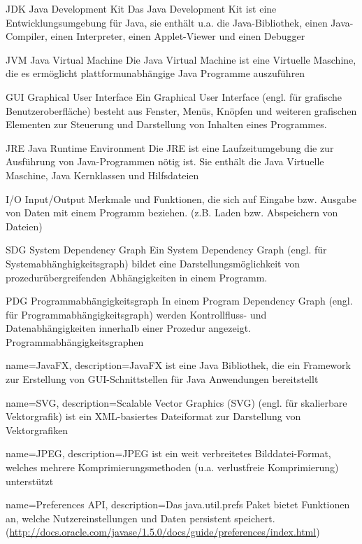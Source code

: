  {JDK}
  {Java Development Kit}
  {Das Java Development Kit ist eine Entwicklungsumgebung für Java, sie enthält u.a. die Java-Bibliothek, einen Java-Compiler, einen Interpreter, einen Applet-Viewer und einen Debugger}

  {JVM}
  {Java Virtual Machine}
  {Die Java Virtual Machine ist eine Virtuelle Maschine, die es ermöglicht plattformunabhängige Java Programme auszuführen}

  {GUI}
  {Graphical User Interface}
  {Ein Graphical User Interface (engl. für grafische Benutzeroberfläche) besteht aus Fenster, Menüs, Knöpfen und weiteren grafischen Elementen zur Steuerung und Darstellung von Inhalten eines Programmes.}

  {JRE}
  {Java Runtime Environment}
  {Die JRE ist eine Laufzeitumgebung die zur Ausführung von Java-Programmen nötig ist. Sie enthält die Java Virtuelle Maschine, Java Kernklassen und Hilfsdateien}

  {I/O}
  {Input/Output}
  {Merkmale und Funktionen, die sich auf Eingabe bzw. Ausgabe von Daten mit einem Programm beziehen. (z.B. Laden bzw. Abspeichern von Dateien)}

  {SDG}
  {System Dependency Graph}
  {Ein System Dependency Graph (engl. für Systemabhänghigkeitsgraph) bildet eine Darstellungsmöglichkeit von prozedurübergreifenden Abhängigkeiten in einem Programm.}

  {PDG}
  {Programmabhängigkeitsgraph}
  {In einem Program Dependency Graph (engl. für Programmabhängigkeitsgraph) werden Kontrollfluss- und Datenabhängigkeiten innerhalb einer Prozedur angezeigt.}
  {Programmabhängigkeitsgraphen}

{
  name=JavaFX,
  description={JavaFX ist eine Java Bibliothek, die ein Framework zur Erstellung von GUI-Schnittstellen für Java Anwendungen bereitstellt}
}

{
  name=SVG,
  description={Scalable Vector Graphics (SVG) (engl. für skalierbare Vektorgrafik) ist ein XML-basiertes Dateiformat zur Darstellung von Vektorgrafiken}
}

{
  name=JPEG,
  description={JPEG ist ein weit verbreitetes Bilddatei-Format, welches mehrere Komprimierungsmethoden (u.a. verlustfreie Komprimierung) unterstützt}
}

{
  name=Preferences API,
  description={Das java.util.prefs Paket bietet Funktionen an, welche Nutzereinstellungen und Daten persistent speichert. (\url{http://docs.oracle.com/javase/1.5.0/docs/guide/preferences/index.html})}
}


